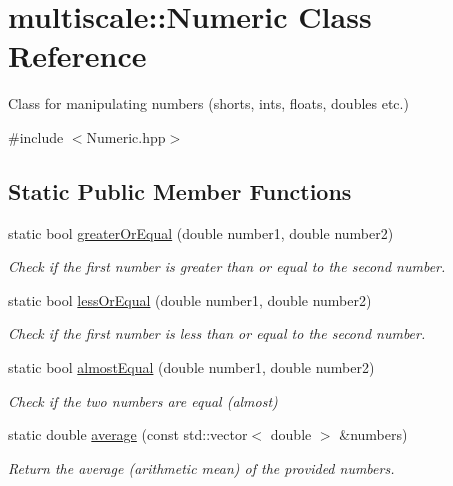 \hypertarget{classmultiscale_1_1Numeric}{\section{multiscale\-:\-:\-Numeric \-Class \-Reference}
\label{classmultiscale_1_1Numeric}
}


\-Class for manipulating numbers (shorts, ints, floats, doubles etc.)  




{\ttfamily \#include $<$\-Numeric.\-hpp$>$}

\subsection*{\-Static \-Public \-Member \-Functions}
\begin{DoxyCompactItemize}
\item 
static bool \hyperlink{classmultiscale_1_1Numeric_a13ae1e2b35654937bed4c19e776ccdb5}{greater\-Or\-Equal} (double number1, double number2)
\begin{DoxyCompactList}\small\item\em \-Check if the first number is greater than or equal to the second number. \end{DoxyCompactList}\item 
static bool \hyperlink{classmultiscale_1_1Numeric_a7f21159a23c71c1d37e1c487e9ff815c}{less\-Or\-Equal} (double number1, double number2)
\begin{DoxyCompactList}\small\item\em \-Check if the first number is less than or equal to the second number. \end{DoxyCompactList}\item 
static bool \hyperlink{classmultiscale_1_1Numeric_a996dda9f7361be59b4614eace0b93f24}{almost\-Equal} (double number1, double number2)
\begin{DoxyCompactList}\small\item\em \-Check if the two numbers are equal (almost) \end{DoxyCompactList}\item 
static double \hyperlink{classmultiscale_1_1Numeric_a35c4c545f6ef78c31c94a85b9f070ee5}{average} (const std\-::vector$<$ double $>$ \&numbers)
\begin{DoxyCompactList}\small\item\em \-Return the average (arithmetic mean) of the provided numbers. \end{DoxyCompactList}\item 

\end{DoxyCompactItemize}
